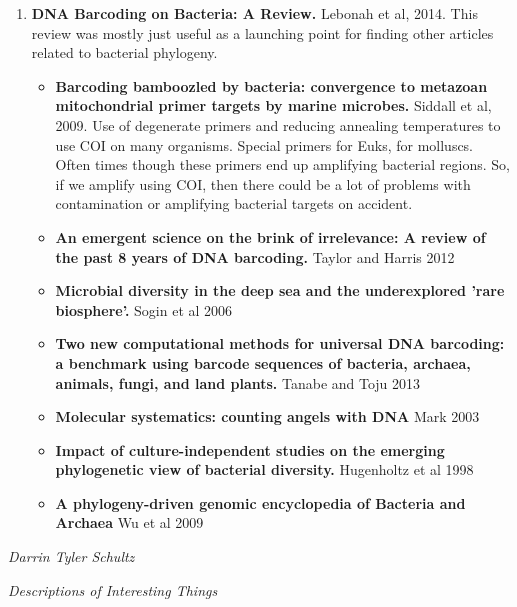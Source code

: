 \documentclass[12pt]{article}
\title{\tit1}
\author{\auth1}
\date{\prog1}
\def \auth1{Darrin Tyler Schultz}
\def \prog1{Descriptions of Interesting Things}
\begin{document}
\maketitle %
\vspace{8pt}

\begin{enumerate}
\item \textbf{DNA Barcoding on Bacteria: A Review.} Lebonah et al,
  2014. This review was mostly just useful as a launching point for
  finding other articles related to bacterial phylogeny.
\begin{itemize}
\item \textbf{Barcoding bamboozled by bacteria: convergence to
    metazoan mitochondrial primer targets by marine microbes.} Siddall
  et al, 2009. Use of degenerate primers and reducing annealing
  temperatures to use COI on many organisms. Special primers for Euks,
  for molluscs. Often times though these primers end up amplifying
  bacterial regions. So, if we amplify using COI, then there could be
  a lot of problems with contamination or amplifying bacterial targets
  on accident.
\item \textbf{An emergent science on the brink of irrelevance: A
    review of the past 8 years of DNA barcoding.} Taylor and Harris 2012
\item \textbf{Microbial diversity in the deep sea and the
    underexplored 'rare biosphere'.} Sogin et al 2006
\item \textbf{Two new computational methods for universal DNA
    barcoding: a benchmark using barcode sequences of bacteria,
    archaea, animals, fungi, and land plants.} Tanabe and Toju 2013
\item \textbf{Molecular systematics: counting angels with DNA} Mark 2003
\item \textbf{Impact of culture-independent studies on the emerging
    phylogenetic view of bacterial diversity.} Hugenholtz et al 1998
\item \textbf{A phylogeny-driven genomic encyclopedia of Bacteria and
    Archaea} Wu et al 2009
\end{itemize}
\end{enumerate}
\vspace*{\fill}
 \begin{center}
 \textit{\auth1}

 \textit{\prog1}
\end{center}
\end{document}
